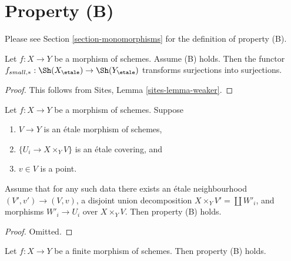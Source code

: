\section{Property (B)}
\label{section-B}

\noindent
Please see Section \ref{section-monomorphisms} for the definition of property
(B).

\begin{lemma}
\label{lemma-property-B-implies}
Let $f : X \to Y$ be a morphism of schemes. Assume (B) holds.
Then the functor
$f_{small, *} :
\Sh(X_\etale)
\to
\Sh(Y_\etale)$
transforms surjections into surjections.
\end{lemma}

\begin{proof}
This follows from
Sites, Lemma \ref{sites-lemma-weaker}.
\end{proof}

\begin{lemma}
\label{lemma-simplify-B}
Let $f : X \to Y$ be a morphism of schemes. Suppose
\begin{enumerate}
\item $V \to Y$ is an \'etale morphism of schemes,
\item $\{U_i \to X \times_Y V\}$ is an \'etale covering, and
\item $v \in V$ is a point.
\end{enumerate}
Assume that for any such data there exists an \'etale neighbourhood
$(V', v') \to (V, v)$, a disjoint union decomposition
$X \times_Y V' = \coprod W'_i$, and morphisms $W'_i \to U_i$
over $X \times_Y V$. Then property (B) holds.
\end{lemma}

\begin{proof}
Omitted.
\end{proof}

\begin{lemma}
\label{lemma-finite-B}
Let $f : X \to Y$ be a finite morphism of schemes.
Then property (B) holds.
\end{lemma}


